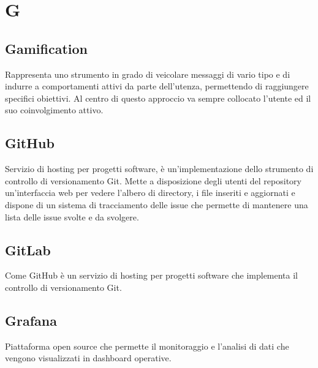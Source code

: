 \section*{G}

\subsection{Gamification}
Rappresenta uno strumento in grado di veicolare messaggi di vario tipo e di indurre a comportamenti attivi da parte dell’utenza, permettendo di raggiungere specifici obiettivi. Al centro di questo approccio va sempre collocato l'utente ed il suo coinvolgimento attivo.

\subsection{GitHub}
Servizio di hosting per progetti software, è un'implementazione dello strumento di controllo di versionamento Git. Mette a disposizione degli utenti del repository un'interfaccia web per vedere l'albero di directory, i file inseriti e aggiornati e dispone di un sistema di tracciamento delle issue che permette di mantenere una lista delle issue svolte e da svolgere.

\subsection{GitLab}
Come GitHub è un servizio di hosting per progetti software che implementa il controllo di versionamento Git. 

\subsection{Grafana}
Piattaforma open source che permette il monitoraggio e l'analisi di dati che vengono visualizzati in dashboard operative. 
